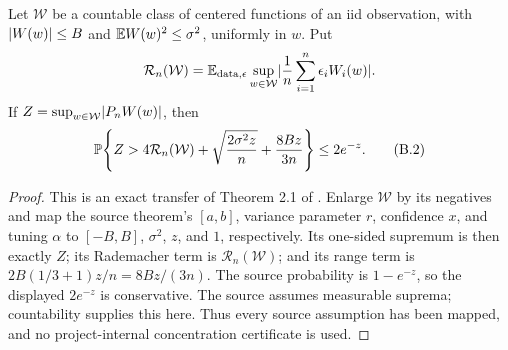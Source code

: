 \begin{lemma}
\label{lem:supremum-bernstein}
Let \(\mathcal W\) be a countable class of centered functions of an iid
observation, with \(\lvert W(w)\rvert\le B\) and
\(\mathbb E W(w)^2\le\sigma^2\), uniformly in \(w\).  Put
\[
 \mathcal R_n(\mathcal W)
 =\mathbb E_{\mathrm{data},\epsilon}\sup_{w\in\mathcal W}
   \lvert \frac1n\sum_{i=1}^n\epsilon_iW_i(w)\rvert.
\]
If \(Z=\sup_{w\in\mathcal W}\lvert P_nW(w)\rvert\), then
\[
 \mathbb P\!\left\{Z>4\mathcal R_n(\mathcal W)
            +\sqrt{\frac{2\sigma^2z}{n}}
            +\frac{8Bz}{3n}\right\}\le2e^{-z}.
 \tag{B.2}
\]
\end{lemma}
\begin{proof}
This is an exact transfer of Theorem 2.1 of
\citet[pp. 1503--1504]{bartlett2005local}.  Enlarge \(\mathcal W\) by its
negatives and map the source theorem's \([a,b]\), variance parameter \(r\),
confidence \(x\), and tuning \(\alpha\) to
\([-B,B]\), \(\sigma^2\), \(z\), and \(1\), respectively.  Its one-sided
supremum is then exactly \(Z\); its Rademacher term is
\(\mathcal R_n(\mathcal W)\); and its range term is
\(2B(1/3+1)z/n=8Bz/(3n)\).  The source probability is \(1-e^{-z}\), so
the displayed \(2e^{-z}\) is conservative.  The source assumes measurable
suprema; countability supplies this here.  Thus every source assumption
has been mapped, and no project-internal concentration certificate is used.
\end{proof}

